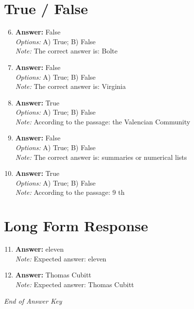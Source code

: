 \documentclass[12pt]{article}
\begin{document}
\section*{True / False}
\begin{enumerate}[label=\arabic*.]
\setcounter{enumi}{5}
\item \textbf{Answer:} False
\\ \textit{Options:} A) True; B) False
\\ \textit{Note:} The correct answer is: Bolte
\item \textbf{Answer:} False
\\ \textit{Options:} A) True; B) False
\\ \textit{Note:} The correct answer is: Virginia
\item \textbf{Answer:} True
\\ \textit{Options:} A) True; B) False
\\ \textit{Note:} According to the passage: the Valencian Community
\item \textbf{Answer:} False
\\ \textit{Options:} A) True; B) False
\\ \textit{Note:} The correct answer is: summaries or numerical lists
\item \textbf{Answer:} True
\\ \textit{Options:} A) True; B) False
\\ \textit{Note:} According to the passage: 9 th
\end{enumerate}

\section*{Long Form Response}
\begin{enumerate}[label=\arabic*.]
\setcounter{enumi}{10}
\item \textbf{Answer:} eleven
\\ \textit{Note:} Expected answer: eleven
\item \textbf{Answer:} Thomas Cubitt
\\ \textit{Note:} Expected answer: Thomas Cubitt
\end{enumerate}

\vfill
\noindent\textit{End of Answer Key}
\end{document}
